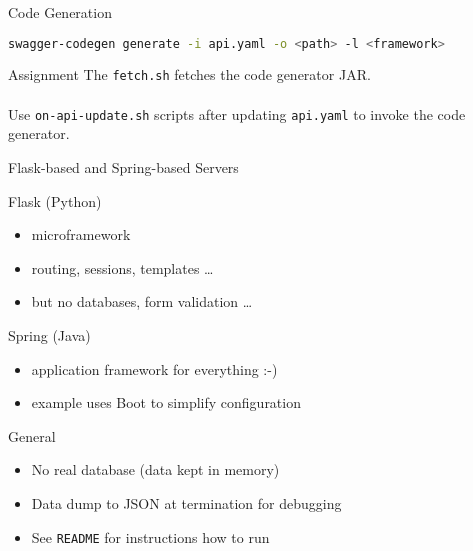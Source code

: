 \begin{frame}[fragile]{Code Generation}
\begin{lstlisting}[language=bash,style=mini]
swagger-codegen generate -i api.yaml -o <path> -l <framework>
\end{lstlisting}

    \begin{block}{Assignment}
        The \lstinline|fetch.sh| fetches the code generator JAR. \\
        ~\\
        Use \lstinline|on-api-update.sh| scripts after updating
        \lstinline{api.yaml} to invoke the code generator.
    \end{block}
\end{frame}


\begin{frame}{Flask-based and Spring-based Servers}
    \begin{block}{Flask (Python)}
        \begin{itemize}
            \item microframework
            \item routing, sessions, templates \ldots
            \item but no databases, form validation \ldots
        \end{itemize}
    \end{block}
    \begin{block}{Spring (Java)}
        \begin{itemize}
            \item application framework for everything :-)
            \item example uses Boot to simplify configuration
        \end{itemize}
    \end{block}
    \begin{block}{General}
        \begin{itemize}
            \item No real database (data kept in memory)
            \item Data dump to JSON at termination for debugging
            \item See \lstinline{README} for instructions how to run
        \end{itemize}
    \end{block}
\end{frame}


